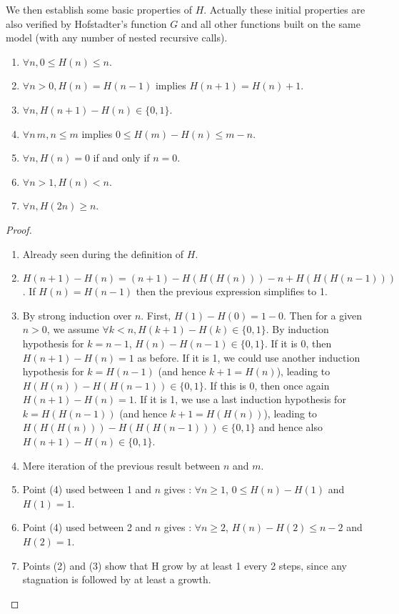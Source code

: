 \documentclass[a4paper,11pt]{article}
\begin{document}
We then establish some basic properties of $H$. Actually these initial
properties are also verified by Hofstadter's function $G$
and all other functions built on the same model (with any number of
nested recursive calls).
\begin{theorem}\label{Gprops}
\noindent
\begin{enumerate}
\item $\forall n, 0 \le H(n) \le n$.
\item $\forall n>0, H(n)=H(n-1)$ implies $H(n+1)=H(n)+1$.
\item $\forall n, H(n+1)-H(n) \in \{0,1\}$.
\item $\forall n\,m, n\le m$ implies $0 \le H(m)-H(n) \le m-n$.
\item $\forall n, H(n)=0$ if and only if $n=0$.
\item $\forall n>1, H(n)<n$.
\item $\forall n, H(2n)\ge n$.
\end{enumerate}
\end{theorem}
\begin{proof}
\noindent
\begin{enumerate}
\item Already seen during the definition of $H$.
\item $H(n+1)-H(n) = (n+1)-H(H(H(n)))-n+H(H(H(n-1)))$.
If $H(n)=H(n-1)$ then the previous expression simplifies to 1.
\item By strong induction over $n$. First, $H(1)-H(0)=1-0$. Then
for a given $n>0$, we assume $\forall k<n, H(k+1)-H(k) \in \{0,1\}$.
By induction hypothesis for $k=n-1$, $H(n)-H(n-1) \in\{0,1\}$.
If it is 0, then $H(n+1)-H(n) = 1$ as before. If it is 1, we could use another
induction hypothesis for $k=H(n-1)$ (and hence $k+1 = H(n)$), leading
to $H(H(n))-H(H(n-1)) \in \{0,1\}$. If this is 0, then once again
$H(n+1)-H(n) = 1$. If it is 1, we use a last induction hypothesis for
$k=H(H(n-1))$ (and hence $k+1 = H(H(n))$), leading to
$H(H(H(n)))-H(H(H(n-1))) \in \{0,1\}$ and hence also $H(n+1)-H(n) \in \{0,1\}$.
\item Mere iteration of the previous result between $n$ and $m$.
\item Point (4) used between 1 and $n$ gives :
  $\forall n\ge 1$, $0 \le H(n)-H(1)$ and $H(1)=1$.
\item Point (4) used between 2 and $n$ gives :
  $\forall n\ge 2$, $H(n)-H(2) \le n-2$ and $H(2)=1$.
\item Points (2) and (3) show that H grow by at least 1 every 2 steps,
  since any stagnation is followed by at least a growth.
\end{enumerate}
\end{proof}
\end{document}
